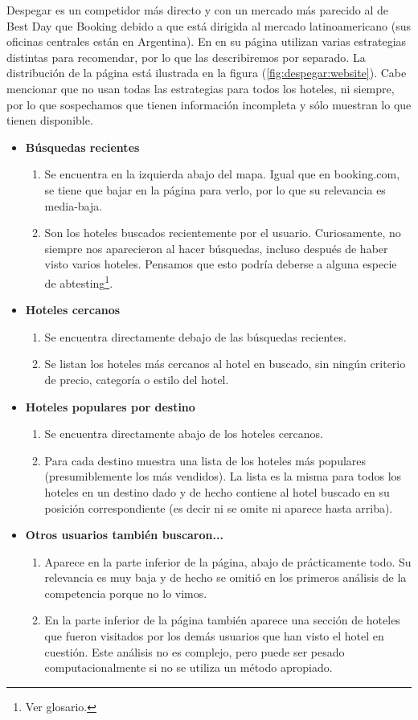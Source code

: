 \documentclass[12pt]{report}
\begin{document}
Despegar es un competidor más directo y con un mercado más parecido al de Best Day que Booking debido a que está dirigida al mercado latinoamericano (sus oficinas centrales están en Argentina). En en su página utilizan varias estrategias distintas para recomendar, por lo que las describiremos por separado. La distribución de la página está ilustrada en la figura (\ref{fig:despegar:website}). Cabe mencionar que no usan todas las estrategias para todos los hoteles, ni siempre, por lo que sospechamos que tienen información incompleta y sólo muestran lo que tienen disponible.
\begin{itemize}
	\item \textbf{Búsquedas recientes}
	\begin{enumerate}
		\item Se encuentra en la izquierda abajo del mapa. Igual que en booking.com, se tiene que bajar en la página para verlo, por lo que su relevancia es media-baja.
		\item Son los hoteles buscados recientemente por el usuario. Curiosamente, no siempre nos aparecieron al hacer búsquedas, incluso después de haber visto varios hoteles. Pensamos que esto podría deberse a alguna especie de \gls{abtesting}\footnote{Ver glosario.}.
	\end{enumerate}
	\item \textbf{Hoteles cercanos}
	\begin{enumerate}
		\item Se encuentra directamente debajo de las búsquedas recientes.
		\item Se listan los hoteles más cercanos al hotel en buscado, sin ningún criterio de precio, categoría o estilo del hotel.
	\end{enumerate}
		\item \textbf{Hoteles populares por destino}
	\begin{enumerate}
		\item Se encuentra directamente abajo de los hoteles cercanos.
		\item Para cada destino muestra una lista de los hoteles más populares (presumiblemente los más vendidos). La lista es la misma para todos los hoteles en un destino dado y de hecho contiene al hotel buscado en su posición correspondiente (es decir ni se omite ni aparece hasta arriba).
	\end{enumerate}
	\item \textbf{Otros usuarios también buscaron...}
	\begin{enumerate}
		\item Aparece en la parte inferior de la página, abajo de prácticamente todo. Su relevancia es muy baja y de hecho se omitió en los primeros análisis de la competencia porque no lo vimos.
		\item En la parte inferior de la página también aparece una sección de hoteles que fueron visitados por los demás usuarios que han visto el hotel en cuestión. Este análisis no es complejo, pero puede ser pesado computacionalmente si no se utiliza un  método apropiado.
	\end{enumerate}
\end{itemize}
\end{document}
